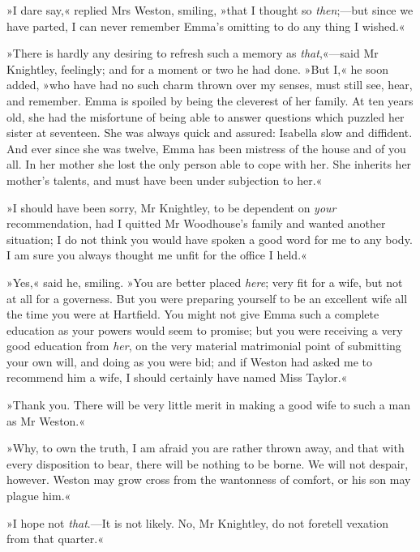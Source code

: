 »I dare say,« replied Mrs Weston, smiling, »that I thought so \textit{then};—but since we have parted, I can never remember Emma's omitting to do any thing I wished.«

»There is hardly any desiring to refresh such a memory as \textit{that},«—said Mr Knightley, feelingly; and for a moment or two he had done. »But I,« he soon added, »who have had no such charm thrown over my senses, must still see, hear, and remember. Emma is spoiled by being the cleverest of her family. At ten years old, she had the misfortune of being able to answer questions which puzzled her sister at seventeen. She was always quick and assured: Isabella slow and diffident. And ever since she was twelve, Emma has been mistress of the house and of you all. In her mother she lost the only person able to cope with her. She inherits her mother's talents, and must have been under subjection to her.«

»I should have been sorry, Mr Knightley, to be dependent on \textit{your} recommendation, had I quitted Mr Woodhouse's family and wanted another situation; I do not think you would have spoken a good word for me to any body. I am sure you always thought me unfit for the office I held.«

»Yes,« said he, smiling. »You are better placed \textit{here}; very fit for a wife, but not at all for a governess. But you were preparing yourself to be an excellent wife all the time you were at Hartfield. You might not give Emma such a complete education as your powers would seem to promise; but you were receiving a very good education from \textit{her}, on the very material matrimonial point of submitting your own will, and doing as you were bid; and if Weston had asked me to recommend him a wife, I should certainly have named Miss Taylor.«

»Thank you. There will be very little merit in making a good wife to such a man as Mr Weston.«

»Why, to own the truth, I am afraid you are rather thrown away, and that with every disposition to bear, there will be nothing to be borne. We will not despair, however. Weston may grow cross from the wantonness of comfort, or his son may plague him.«

»I hope not \textit{that}.—It is not likely. No, Mr Knightley, do not foretell vexation from that quarter.«

